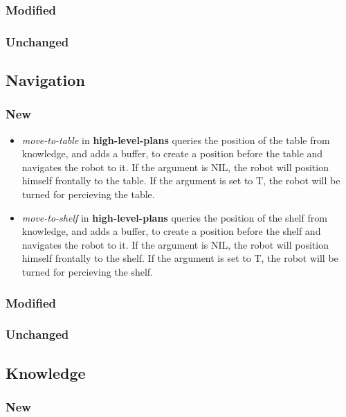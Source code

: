 \documentclass[main.tex]{subfiles}
\begin{document}
                \subsubsection{Modified}
                \subsubsection{Unchanged}
                
                \subsection{Navigation}
                \subsubsection{New}
                  \begin{itemize}
                    \item \textit{move-to-table} in \textbf{high-level-plans} queries the position of the table from knowledge, and adds a buffer, to create a position before the table and navigates the robot to it. If the argument is NIL, the robot will position himself frontally to the table. If the argument is set to T, the robot will be turned for percieving the table.
                    \item \textit{move-to-shelf} in \textbf{high-level-plans} queries the position of the shelf from knowledge, and adds a buffer, to create a position before the shelf and navigates the robot to it. If the argument is NIL, the robot will position himself frontally to the shelf. If the argument is set to T, the robot will be turned for percieving the shelf.
                  \end{itemize}
                \subsubsection{Modified}
                \subsubsection{Unchanged}
                
                \subsection{Knowledge}
                \subsubsection{New}
\end{document}
